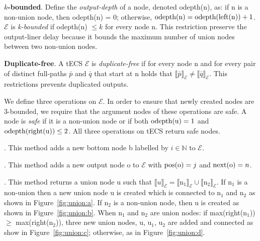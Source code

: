 \textbf{$k$-bounded}. Define the \emph{output-depth} of a node, denoted odepth(\textrm{n}), as: if \textrm{n} is a non-union node, then odepth(\textrm{n}) = 0; otherwise, $\text{odepth(\textrm{n})} = \text{odepth(left(\textrm{n}))} + 1$. $\mathcal{E}$ is \emph{k-bounded} if odepth(\textrm{n}) $\leq k$ for every node \textrm{n}. This restriction preserve the output-liner delay because it bounds the maximum number of union nodes between two non-union nodes.

\textbf{Duplicate-free}. A tECS $\mathcal{E}$ is \emph{duplicate-free} if for every node \textrm{n} and for every pair of distinct full-paths $\bar{p}$ and $\bar{q}$ that start at \textrm{n} holds that ${\llbracket \bar{p} \rrbracket}_{\mathcal{E}} \ne {\llbracket \bar{q} \rrbracket}_{\mathcal{E}}$. This restrictions prevents duplicated outputs.

We define three operations on $\mathcal{E}$. In order to ensure that newly created nodes are $3$-bounded, we require that the argument nodes of these operations are safe. A node is \emph{safe} if it is a non-union node or if both $\text{odepth(\textrm{u})} = 1$ and $\text{odepth(right(\textrm{u}))} \le 2$. All three operations on tECS return safe nodes.

. This method adds a new bottom node \textrm{b} labelled by $i \in \mathbb{N}$ to $\mathcal{E}$.

. This method adds a new output node \textrm{o} to $\mathcal{E}$ with $\text{pos(\textrm{o})} = j$ and $\text{next(\textrm{o})} = n$.

. This method returns a union node \textrm{u} such that ${\llbracket u \rrbracket}_{\mathcal{E}} = {\llbracket \textrm{n}_{1} \rrbracket}_{\mathcal{E}} \cup {\llbracket \textrm{n}_{2} \rrbracket}_{\mathcal{E}}$. If $\textrm{n}_{1}$ is a non-union then a new union node \textrm{u} is created which is connected to $\textrm{n}_{1}$ and $\textrm{n}_{2}$ as shown in Figure~\ref{fig:union:a}. If $\textrm{n}_{2}$ is a non-union node, then \textrm{u} is created as shown in Figure~\ref{fig:union:b}. When $\textrm{n}_{1}$ and $\textrm{n}_{2}$ are union nodes: if max(right($\textrm{n}_{1}$)) $\ge$ max(right($\textrm{n}_{2}$)), three new union nodes, \textrm{u}, $\textrm{u}_{1}$, $\textrm{u}_{2}$ are added and connected as show in Figure~\ref{fig:union:c}; otherwise, as in Figure~\ref{fig:union:d}.

